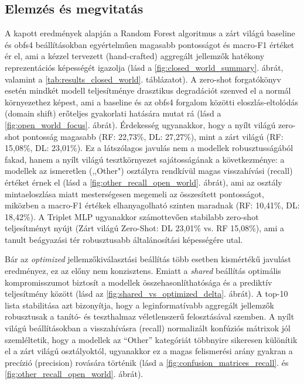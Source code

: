 \documentclass[a4paper,oneside]{article}
\begin{document}
\subsection{Elemzés és megvitatás}
A kapott eredmények alapján a Random Forest algoritmus a zárt világú baseline és obfs4 beállításokban egyértelműen magasabb pontosságot és macro-F1 értéket ér el, ami a kézzel tervezett (hand-crafted) aggregált jellemzők hatékony reprezentációs képességét igazolja (lásd a \ref{fig:closed_world_summary}.
ábrát, valamint a \ref{tab:results_closed_world}. táblázatot). A zero-shot forgatókönyv esetén mindkét modell teljesítménye drasztikus degradációt szenved el a normál környezethez képest, ami a baseline és az obfs4 forgalom közötti eloszlás-eltolódás (domain shift) erőteljes gyakorlati hatására mutat rá (lásd a \ref{fig:open_world_focus}. ábrát).
Érdekesség ugyanakkor, hogy a nyílt világú zero-shot pontosság magasabb (RF: 22,73\%, DL: 27,27\%), mint a zárt világú (RF: 15,08\%, DL: 23,01\%).
Ez a látszólagos javulás nem a modellek robusztusságából fakad, hanem a nyílt világú tesztkörnyezet sajátosságának a következménye: a modellek az ismeretlen (,,Other") osztályra rendkívül magas visszahívási (recall) értéket érnek el (lásd a \ref{fig:other_recall_open_world}. ábrát), ami az osztály mintaeloszlása miatt mesterségesen megemeli az összesített pontosságot, miközben a macro-F1 értékek elhanyagolható szinten maradnak (RF: 10,41\%, DL: 18,42\%). A Triplet MLP ugyanakkor számottevően stabilabb zero-shot teljesítményt nyújt (Zárt világú Zero-Shot: DL 23,01\% vs. RF 15,08\%), ami a tanult beágyazási tér robusztusabb általánosítási képességére utal. 

Bár az \textit{optimized} jellemzőkiválasztási beállítás több esetben kismértékű javulást eredményez, ez az előny nem konzisztens. Emiatt a \textit{shared} beállítás 
optimális kompromisszumot biztosít a modellek összehasonlíthatósága és a prediktív teljesítmény között (lásd az \ref{fig:shared_vs_optimized_delta}. ábrát). A top-10 lista stabilitása azt bizonyítja, hogy a leginformatívabb aggregált jellemzők robusztusak a tanító- és teszthalmaz véletlenszerű felosztásával szemben. A nyílt világú beállításokban a visszahívásra (recall) normalizált konfúziós mátrixok jól szemléltetik, hogy a modellek az ``Other'' kategóriát többnyire sikeresen különítik el a zárt világú osztályoktól, ugyanakkor ez a magas felismerési arány gyakran a precízió (precision) rovására történik (lásd a \ref{fig:confusion_matrices_recall}. és \ref{fig:other_recall_open_world}. ábrát).
\end{document}
